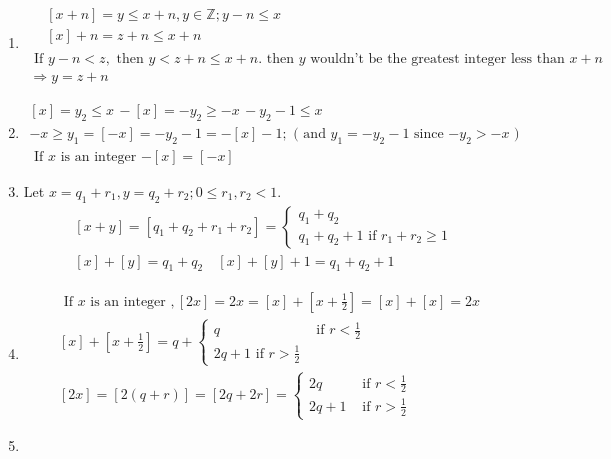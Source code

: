 \documentclass[twoside]{amsart}
\theoremstyle{plain}
\theoremstyle{definition}
\newcommand{\exercisehead}[1]
  {\smallskip
   \noindent{\small\bf Exercise #1.}}
\begin{document}
\exercisehead{4} \begin{enumerate}
\item 
\[
\begin{gathered}
\begin{aligned} & [x+n] = y \leq x + n, y\in \mathbb{Z}; y - n \leq x  \\
  & [x] + n =z + n \leq x+ n 
\end{aligned} \\
\text{ If } y-n < z, \text{ then } y < z + n \leq x + n.  \text{ then $y$ wouldn't be the greatest integer less than $x+n$ } \\
\Longrightarrow y = z + n 
\end{gathered}
\]
\item \[
\begin{gathered}
  [x] = y_2 \leq x \, -[x] = - y_2 \geq -x \, -y_2 -1 \leq x \\
  -x \geq y_1 = [-x] = -y_2 -1 = -[x] -1 ; \text{ ( and $y_1 = -y_2 - 1$ since $-y_2 >-x$ ) }  \\
  \text{ If $x$ is an integer $-[x] = [-x]$ }
\end{gathered}
\]
\item Let $x=q_1 + r_1, y=q_2 + r_2; 0 \leq r_1, r_2 < 1$.  
\[
\begin{gathered}
  [x+y] = [q_1 + q_2 + r_1 + r_2] = \begin{cases} q_1 +q_2 \\ q_1 + q_2 +1 \text{ if } r_1+r_2 \geq 1 \end{cases} \\
  [x] + [y] = q_1+q_2 \quad [x]+[y]+1 = q_1 +q_2 +1 
\end{gathered}
  \]
\item \[
\begin{aligned}
  & \text{ If $x$ is an integer }, [2x] = 2x = [x]+[x+\frac{1}{2} ] = [x]+[x] = 2x \\
  & [x] + [x+\frac{1}{2}] = q + \begin{cases} q & \text{ if } r < \frac{1}{2} \\ 2q+1 \text{ if } r > \frac{1}{2} \end{cases} \\
  & [2x] = [2(q+r)] = [2q+2r] = \begin{cases} 2q & \text{ if } r < \frac{1}{2} \\ 2q+1 & \text{ if } r > \frac{1}{2} \end{cases} 
\end{aligned}
\]
\item 
\[
\begin{aligned}

\end{aligned}\]
\end{enumerate}
\end{document}
